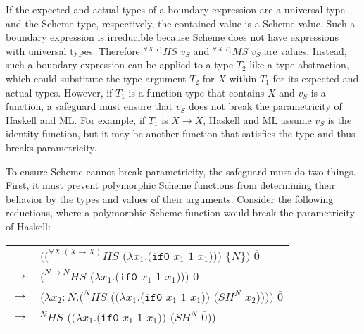 If the expected and actual types of a boundary expression are a universal type and the Scheme type, respectively, the contained value is a Scheme value.  Such a boundary expression is irreducible because Scheme does not have expressions with universal types.  Therefore $^{\forall X.T_{1}}HS$ $v_{S}$ and $^{\forall X.T_{1}}MS$ $v_{S}$ are values.  Instead, such a boundary expression can be applied to a type $T_{2}$ like a type abstraction, which could substitute the type argument $T_{2}$ for $X$ within $T_{1}$ for its expected and actual types.  However, if $T_{1}$ is a function type that contains $X$ and $v_{S}$ is a function, a safeguard must ensure that $v_{S}$ does not break the parametricity of Haskell and ML.  For example, if $T_{1}$ is $X\rightarrow X$, Haskell and ML assume $v_{S}$ is the identity function, but it may be another function that satisfies the type and thus breaks parametricity.

To ensure Scheme cannot break parametricity, the safeguard must do two things.  First, it must prevent polymorphic Scheme functions from determining their behavior by the types and values of their arguments.  Consider the following reductions, where a polymorphic Scheme function would break the parametricity of Haskell:

\begin{tabular}{ll}
& $((^{\forall X.(X\rightarrow X)}HS$ $(\lambda x_{1}.(\mathtt{if0}$ $x_{1}$ $1$ $x_{1})))$ $\lbrace N\rbrace)$ $\overline{0}$ \\
$\rightarrow$ & $(^{N\rightarrow N}HS$ $(\lambda x_{1}.(\mathtt{if0}$ $x_{1}$ $1$ $x_{1})))$ $\overline{0}$ \\
$\rightarrow$ & $(\lambda x_{2}:N.(^{N}HS$ $((\lambda x_{1}.(\mathtt{if0}$ $x_{1}$ $1$ $x_{1}))$ $(SH^{N}$ $x_{2}))))$ $\overline{0}$ \\
$\rightarrow$ & $^{N}HS$ $((\lambda x_{1}.(\mathtt{if0}$ $x_{1}$ $1$ $x_{1}))$ $(SH^{N}$ $\overline{0}))$
\end{tabular}

